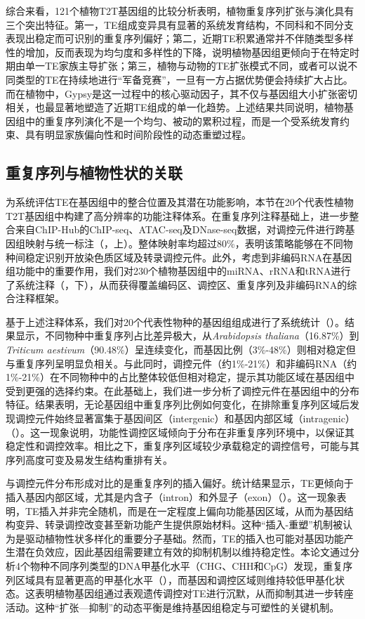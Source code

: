 综合来看，121个植物T2T基因组的比较分析表明，植物重复序列扩张与演化具有三个突出特征。第一，TE组成变异具有显著的系统发育结构，不同科和不同分支表现出稳定而可识别的重复序列偏好；第二，近期TE积累通常并不伴随类型多样性的增加，反而表现为均匀度和多样性的下降，说明植物基因组更倾向于在特定时期由单一TE家族主导扩张；第三，植物与动物的TE扩张模式不同，或者可以说不同类型的TE在持续地进行“军备竞赛”，一旦有一方占据优势便会持续扩大占比。而在植物中，Gypsy是这一过程中的核心驱动因子，其不仅与基因组大小扩张密切相关，也最显著地塑造了近期TE组成的单一化趋势。上述结果共同说明，植物基因组中的重复序列演化不是一个均匀、被动的累积过程，而是一个受系统发育约束、具有明显家族偏向性和时间阶段性的动态重塑过程。

\subsection{重复序列与植物性状的关联}

为系统评估TE在基因组中的整合位置及其潜在功能影响，本节在20个代表性植物T2T基因组中构建了高分辨率的功能注释体系。在重复序列注释基础上，进一步整合来自ChIP-Hub的ChIP-seq、ATAC-seq及DNase-seq数据\cite{fu2022chip}，对调控元件进行跨基因组映射与统一标注（，上）。整体映射率均超过80\%，表明该策略能够在不同物种间稳定识别开放染色质区域及转录调控元件。此外，考虑到非编码RNA在基因组功能中的重要作用，我们对230个植物基因组中的miRNA、rRNA和tRNA进行了系统注释（，下），从而获得覆盖编码区、调控区、重复序列及非编码RNA的综合注释框架。

基于上述注释体系，我们对20个代表性物种的基因组组成进行了系统统计（）。结果显示，不同物种中重复序列占比差异极大，从\textit{Arabidopsis thaliana}（16.87\%）到\textit{Triticum aestivum}（90.48\%）呈连续变化，而基因比例（3\%-48\%）则相对稳定但与重复序列呈明显负相关。与此同时，调控元件（约1\%-21\%）和非编码RNA（约1\%-21\%）在不同物种中的占比整体较低但相对稳定，提示其功能区域在基因组中受到更强的选择约束。在此基础上，我们进一步分析了调控元件在基因组中的分布特征。结果表明，无论基因组中重复序列比例如何变化，在排除重复序列区域后发现调控元件始终显著富集于基因间区（intergenic）和基因内部区域（intragenic）（）。这一现象说明，功能性调控区域倾向于分布在非重复序列环境中，以保证其稳定性和调控效率。相比之下，重复序列区域较少承载稳定的调控信号，可能与其序列高度可变及易发生结构重排有关。

与调控元件分布形成对比的是重复序列的插入偏好。统计结果显示，TE更倾向于插入基因内部区域，尤其是内含子（intron）和外显子（exon）（）。这一现象表明，TE插入并非完全随机，而是在一定程度上偏向功能基因区域，从而为基因结构变异、转录调控改变甚至新功能产生提供原始材料。这种“插入-重塑”机制被认为是驱动植物性状多样化的重要分子基础\cite{tao2025harnessing}。然而，TE的插入也可能对基因功能产生潜在负效应，因此基因组需要建立有效的抑制机制以维持稳定性。本论文通过分析4个物种不同序列类型的DNA甲基化水平（CHG、CHH和CpG）发现，重复序列区域具有显著更高的甲基化水平（），而基因和调控区域则维持较低甲基化状态。这表明植物基因组通过表观遗传调控对TE进行沉默，从而抑制其进一步转座活动。这种“扩张—抑制”的动态平衡是维持基因组稳定与可塑性的关键机制\cite{tao2025harnessing}。

